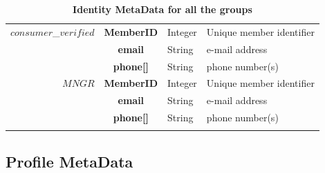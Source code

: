 \begin{table}[H]
\begin{centering}
{\begin{tabular}{ r | c | l | l }
\hline
$consumer$\_$verified$ & {\bf MemberID}		&Integer	& Unique member identifier \\
			& {\bf email}				&String	& e-mail address \\
			& {\bf phone[]}				&String	& phone number(s) \\
\hline
$MNGR$ 		& {\bf MemberID}			&Integer	& Unique member identifier \\
			& {\bf email}				&String	& e-mail address \\
			& {\bf phone[]}				&String	& phone number(s) \\
\Xhline{1.5pt}
\end{tabular}
}
\caption{\small\textbf{Identity MetaData for all the groups}}
\label{tab:IdentityMetaData}
\end{centering}
\vspace{-1cm}
\end{table}


\subsection{Profile MetaData}

